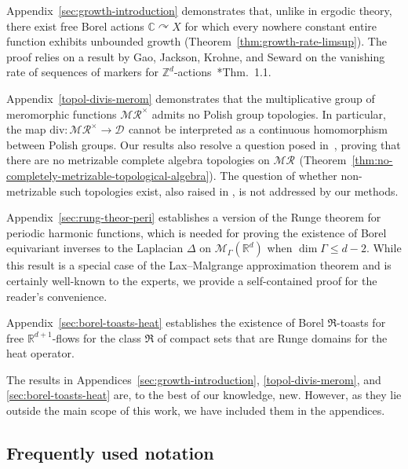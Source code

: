 \documentclass[12pt]{paper}
\numberwithin{equation}{section}
\theoremstyle{plain}
\theoremstyle{definition}
\newcommand{\C}{\mathbb{C}}
\newcommand{\R}{\mathbb{R}}
\newcommand{\Rd}{\mathbb{R}^{d}}
\newcommand{\Zd}{\mathbb{Z}^{d}}
\newcommand{\mfR}{\mathfrak{R}}
\newcommand{\meas}[2][]{\mathcal{M}_{#1}(#2)}
\newcommand{\merom}[1][]{\mathcal{MR}_{#1}}
\newcommand{\meromnz}{\merom^{\times}}
\newcommand{\divis}[1][]{\mathcal{D}_{#1}}
\newcommand{\dm}{\mathrm{div}}      %
\newcommand{\acts}{\curvearrowright}
\begin{document}
Appendix~\ref{sec:growth-introduction} demonstrates that, unlike in ergodic theory, there exist free
Borel actions \(\C \acts X\) for which every nowhere constant entire function exhibits unbounded
growth (Theorem~\ref{thm:growth-rate-limsup}).  The proof relies on a result by Gao, Jackson, Krohne,
and Seward on the vanishing rate of sequences of markers for
\(\Zd\)-actions~\cite{gaoForcingConstructionsCountable2022}*{Thm.~1.1}.

Appendix~\ref{topol-divis-merom} demonstrates that the multiplicative group of meromorphic functions
\(\meromnz\) admits no Polish group topologies.  In particular, the map
\(\dm : \meromnz \to \divis\) cannot be interpreted as a continuous homomorphism between Polish
groups.  Our results also resolve a question posed
in~\cite{grosse-erdmannLocallyConvexTopology1995}, proving that there are no metrizable complete
algebra topologies on \(\merom\) (Theorem~\ref{thm:no-completely-metrizable-topological-algebra}).
The question of whether non-metrizable such topologies exist, also raised in
\cite{grosse-erdmannLocallyConvexTopology1995}, is not addressed by our methods.

Appendix~\ref{sec:rung-theor-peri} establishes a version of the Runge theorem for periodic
harmonic functions, which is needed for proving the existence of Borel equivariant inverses to the
Laplacian \(\Delta\) on \(\meas[\Gamma]{\Rd}\) when \(\dim \Gamma \le d-2\).  While this result is a
special case of the Lax--Malgrange approximation theorem and is certainly well-known to the experts,
we provide a self-contained proof for the reader's convenience.

Appendix~\ref{sec:borel-toasts-heat} establishes the existence of Borel \(\mfR\)-toasts for free
\(\R^{d+1}\)-flows for the class \(\mfR\) of compact sets that are Runge domains for the heat
operator.

The results in Appendices~\ref{sec:growth-introduction}, \ref{topol-divis-merom}, and
\ref{sec:borel-toasts-heat} are, to the best of our knowledge, new. However, as they lie outside the
main scope of this work, we have included them in the appendices.


\subsection*{Frequently used notation}
\end{document}
